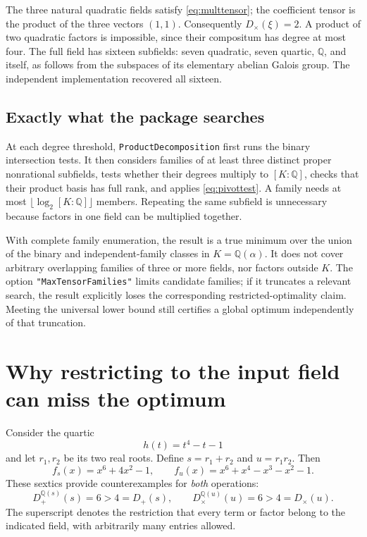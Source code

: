 \documentclass[11pt,letterpaper]{article}
\theoremstyle{definition}
\theoremstyle{remark}
\newcommand{\Q}{\mathbb Q}
\newcommand{\Dplus}{D_{+}}
\newcommand{\Dtimes}{D_{\times}}
\newcommand{\wl}[1]{\texttt{#1}}
\begin{document}
The three natural quadratic fields satisfy \eqref{eq:multtensor}; the
coefficient tensor is the product of the three vectors \((1,1)\).
Consequently \(\Dtimes(\xi)=2\). A product of two quadratic factors is
impossible, since their compositum has degree at most four. The full field
has sixteen subfields: seven quadratic, seven quartic, \(\Q\), and itself,
as follows from the subspaces of its elementary abelian Galois group.
The independent implementation recovered all sixteen.

\subsection{Exactly what the package searches}
At each degree threshold, \wl{ProductDecomposition} first runs the binary
intersection tests. It then considers families of at least three distinct
proper nonrational subfields, tests whether their degrees multiply to
\([K:\Q]\), checks that their product basis has full rank, and applies
\eqref{eq:pivottest}. A family needs at most
\(\lfloor\log_2[K:\Q]\rfloor\) members. Repeating the same subfield is
unnecessary because factors in one field can be multiplied together.

With complete family enumeration, the result is a true minimum over the
union of the binary and independent-family classes in \(K=\Q(\alpha)\).
It does not cover arbitrary overlapping families of three or more fields,
nor factors outside \(K\). The option \wl{"MaxTensorFamilies"} limits
candidate families; if it truncates a relevant search, the result explicitly
loses the corresponding restricted-optimality claim. Meeting the universal
lower bound still certifies a global optimum independently of that
truncation.

\section{Why restricting to the input field can miss the optimum}
\label{sec:external}
Consider the quartic
\[
 h(t)=t^4-t-1
\]
and let \(r_1,r_2\) be its two real roots. Define
\(s=r_1+r_2\) and \(u=r_1r_2\). Then
\begin{equation}
 f_s(x)=x^6+4x^2-1,
 \qquad
 f_u(x)=x^6+x^4-x^3-x^2-1.\label{eq:sextics}
\end{equation}
These sextics provide counterexamples for \emph{both} operations:
\begin{equation}
 D_+^{\Q(s)}(s)=6>4=\Dplus(s),\qquad
 D_\times^{\Q(u)}(u)=6>4=\Dtimes(u).\label{eq:counteropt}
\end{equation}
The superscript denotes the restriction that every term or factor belong
to the indicated field, with arbitrarily many entries allowed.
\end{document}
